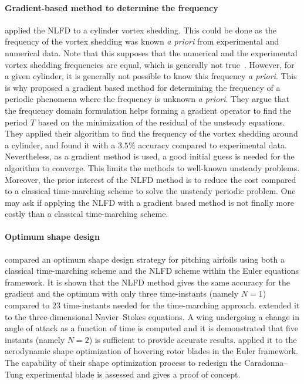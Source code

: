 \paragraph{Gradient-based method to determine the frequency}
\citet{McMullen2001} applied the NLFD to a cylinder
vortex shedding. This could be done as the frequency of the
vortex shedding was known \emph{a priori} from experimental
and numerical data. Note that this supposes that the
numerical and the experimental vortex shedding frequencies
are equal, which is generally not true~\cite{Kato1991}.
However, for a given cylinder, it is generally not
possible to know this frequency \emph{a priori}. This is why
\citet{McMullen2002, McMullen2006a}
proposed a gradient based method for determining the frequency
of a periodic phenomena where the frequency is unknown
\emph{a priori}. They argue that the frequency domain formulation
helps forming a gradient operator to find the period $T$ based
on the minimization of the residual of the unsteady equations.
They applied their algorithm to find the frequency of the vortex
shedding around a cylinder, and found it with a $3.5\%$ accuracy
compared to experimental data. Nevertheless, as a gradient method is 
used, a good initial guess is needed for the algorithm to
converge. This limits the methods to well-known unsteady
problems. Moreover, the prior interest of the NLFD method is
to reduce the cost compared to a classical time-marching scheme
to solve the unsteady periodic problem. One may ask
if applying the NLFD with a gradient based method is not finally
more costly than a classical time-marching scheme.

\paragraph{Optimum shape design}
\citet{Nadarajah2003} compared an optimum shape design 
strategy for pitching airfoils 
using both a classical time-marching scheme
and the NLFD scheme within the Euler equations
framework. It is shown that the NLFD method
gives the same accuracy for the gradient and the optimum with only 
three time-instants (namely $N=1$)
compared to $23$ time-instants needed for 
the time-marching approach.
\citet{Nadarajah2007} extended it
to the three-dimensional Navier--Stokes equations.
A wing undergoing a change 
in angle of attack as a function of time is computed and
it is demonstrated that
five instants (namely $N=2$) is sufficient to provide
accurate results.
\citet{Tatossian2011} applied it
to the aerodynamic shape optimization of hovering rotor blades
in the Euler framework.
The capability of 
their shape optimization process
to redesign the Caradonna–Tung experimental 
blade is assessed and gives a proof
of concept.

